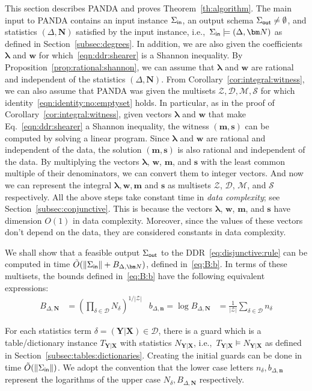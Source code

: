 \documentclass{theoretics}
\newcommand{\norm}[1]{\|#1\|}
\newcommand{\calM}{\mathcal M}
\newcommand{\calS}{\mathcal S}
\newcommand{\calD}{\mathcal D}
\newcommand{\calZ}{\mathcal Z}
\newcommand{\inn}{\text{\sf in}}
\newcommand{\out}{\text{\sf out}}
\newcommand{\panda}{\textsf{PANDA}\xspace}
\begin{document}
This section describes \panda and proves Theorem~\ref{th:algorithm}.
The main input to \panda contains an input instance $\Sigma_{\inn}$,
an output schema $\Sigma_{\out}\neq \emptyset$, and
statistics $(\Delta, \bm N)$ satisfied by the input instance, i.e.,~$\Sigma_{\inn} \models (\Delta, \bm N)$
as defined in Section~\ref{subsec:degrees}.
In addition, we are also given the coefficients $\bm\lambda$ and $\bm w$
for which~\eqref{eqn:ddr:shearer} is a Shannon inequality.
By Proposition~\ref{prop:rational:shannon}, we can assume that $\bm\lambda$ and $\bm w$ are rational and independent of the statistics $(\Delta, \bm N)$.
From Corollary~\ref{cor:integral:witness}, we can also assume that \panda was given the multisets
$\calZ, \calD, \calM, \calS$ for which identity~\eqref{eqn:identity:no:emptyset} holds.
In particular, as in the proof of Corollary~\ref{cor:integral:witness},
given vectors $\bm \lambda$ and $\bm w$ that make Eq.~\eqref{eqn:ddr:shearer} a Shannon inequality,
the witness $(\bm m, \bm s)$ can be computed by solving a linear program.
Since $\bm \lambda$ and $\bm w$ are rational and independent of the data,
the solution $(\bm m, \bm s)$ is also rational and independent of the data.
By multiplying the vectors $\bm \lambda$, $\bm w$, $\bm m$, and $\bm s$ with the least common multiple of their denominators, we can convert them to integer vectors.
And now we can represent the integral $\bm\lambda, \bm w, \bm m$ and $\bm s$ as multisets $\calZ$, $\calD$, $\calM$, and $\calS$ respectively.
All the above steps take constant time in {\em data complexity}; see Section~\ref{subsec:conjunctive}.
This is because the vectors $\bm \lambda$, $\bm w$, $\bm m$, and $\bm s$ have dimension $O(1)$
in data complexity. Moreover, since the values of these vectors don't depend on the data, they are considered constants in data complexity.

We shall show that a feasible output $\Sigma_{\out}$ to the DDR~\eqref{eq:disjunctive:rule}
can be computed in time $\tilde O(\norm{\Sigma_\inn}+B_{\Delta,\bm N})$, defined in~\eqref{eq:B:b}. In terms of
these multisets, the bounds defined in~\eqref{eq:B:b} have the following equivalent
expressions:
%
\begin{align}
  B_{\Delta,\bm N}
  &= \left(\prod_{\delta \in \calD} N_{\delta}\right)^{1/|\calZ|}& b_{\Delta,\bm n} = \log B_{\Delta, \bm N}
  &= \frac{1}{|\calZ|} \sum_{\delta \in \calD} n_{\delta} \label{eq:B:b:integers}
\end{align}

For each statistics term $\delta = (\bm Y|\bm X) \in \calD$, there is a guard which is a
table/dictionary instance $T_{\bm Y|\bm X}$ with statistics $N_{\bm Y|\bm X}$, i.e.,~$T_{\bm
Y|\bm X} \models N_{\bm Y|\bm X}$ as defined in Section~\ref{subsec:tables:dictionaries}.
Creating the initial guards can be done in time $\tilde O(\norm{\Sigma_\inn})$.
We adopt the convention that the lower case letters
$n_\delta, b_{\Delta,\bm n}$ represent the logarithms of the upper case $N_\delta,
B_{\Delta,\bm N}$ respectively.
\end{document}

